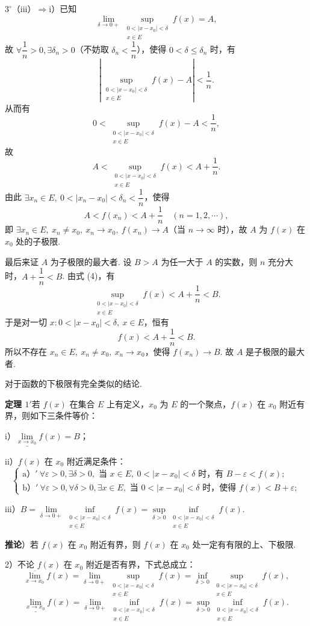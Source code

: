 \documentclass[UTF8, 12pt, fontset=fandol, oneside]{ctexart}
\begin{document}
$3^\circ$（iii）$\Rightarrow$i）已知
\[
  \lim_{\delta\to0+}\sup_{\substack{0<|x-x_0|<\delta\\ x\in E}}f(x)=A,
\]
故 $\forall \dfrac1n>0,\exists \delta_n>0$（不妨取 $\delta_n<\dfrac1n$），使得 $0<\delta\le\delta_n$ 时，有
\[
  \left|\sup_{\substack{0<|x-x_0|<\delta\\ x\in E}}f(x)-A\right|<\frac1n.
\]
从而有
\[
  0<\sup_{\substack{0<|x-x_0|<\delta\\ x\in E}}f(x)-A<\frac1n,
\]
故
\[
  A<\sup_{\substack{0<|x-x_0|<\delta\\ x\in E}}f(x)<A+\frac1n.
\tag{4}
\]
由此 $\exists x_n\in E,\ 0<|x_n-x_0|<\delta_n<\dfrac1n$，使得
\[
  A<f(x_n)<A+\frac1n\quad(n=1,2,\cdots),
\]
即 $\exists x_n\in E,\ x_n\ne x_0,\ x_n\to x_0,\ f(x_n)\to A$（当 $n\to\infty$ 时），故 $A$ 为 $f(x)$ 在 $x_0$ 处的子极限.

最后来证 $A$ 为子极限的最大者. 设 $B>A$ 为任一大于 $A$ 的实数，则 $n$ 充分大时，$A+\dfrac1n<B$. 由式 (4)，有
\[
  \sup_{\substack{0<|x-x_0|<\delta\\ x\in E}}f(x)<A+\frac1n<B.
\]
于是对一切 $x:0<|x-x_0|<\delta,\ x\in E$，恒有
\[
  f(x)<A+\frac1n<B.
\]
所以不存在 $x_n\in E,\ x_n\ne x_0,\ x_n\to x_0$，使得 $f(x_n)\to B$. 故 $A$ 是子极限的最大者.

对于函数的下极限有完全类似的结论.

\noindent\textbf{定理 $1'$}\quad 若 $f(x)$ 在集合 $E$ 上有定义，$x_0$ 为 $E$ 的一个聚点，$f(x)$ 在 $x_0$ 附近有界，则如下三条件等价：

i）$\underline{\lim\limits_{x\to x_0}}f(x)=B$；

ii）$f(x)$ 在 $x_0$ 附近满足条件：
\[
\begin{cases}
\text{a）}'\ \forall \varepsilon>0,\exists\delta>0,\text{ 当 }x\in E,\ 0<|x-x_0|<\delta\text{ 时，有 }B-\varepsilon<f(x);\\
\text{b）}'\ \forall \varepsilon>0,\forall\delta>0,\exists x\in E,\text{ 当 }0<|x-x_0|<\delta\text{ 时，使得 }f(x)<B+\varepsilon;
\end{cases}
\]

iii）$B=\lim\limits_{\delta\to0+}\inf\limits_{\substack{0<|x-x_0|<\delta\\ x\in E}}f(x)
=\sup\limits_{\delta>0}\inf\limits_{\substack{0<|x-x_0|<\delta\\ x\in E}}f(x)$.

\noindent\textbf{推论}）若 $f(x)$ 在 $x_0$ 附近有界，则 $f(x)$ 在 $x_0$ 处一定有有限的上、下极限.

2）不论 $f(x)$ 在 $x_0$ 附近是否有界，下式总成立：
\[
  \overline{\lim_{x\to x_0}}f(x)
  =\lim_{\delta\to0+}\sup_{\substack{0<|x-x_0|<\delta\\ x\in E}}f(x)
  =\inf_{\delta>0}\sup_{\substack{0<|x-x_0|<\delta\\ x\in E}}f(x),
\]
\[
  \underline{\lim_{x\to x_0}}f(x)
  =\lim_{\delta\to0+}\inf_{\substack{0<|x-x_0|<\delta\\ x\in E}}f(x)
  =\sup_{\delta>0}\inf_{\substack{0<|x-x_0|<\delta\\ x\in E}}f(x).
\]
\end{document}
